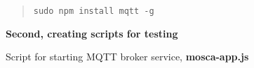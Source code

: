 \documentclass[16pt]{article}
\begin{document}
\begin{enumerate}
\begin{quote}
\texttt{sudo npm install mqtt -g}
\end{quote}

\textbf{Second, creating scripts for testing}

Script for starting MQTT broker service, \textbf{mosca-app.js}








\end{enumerate}
\end{document}
